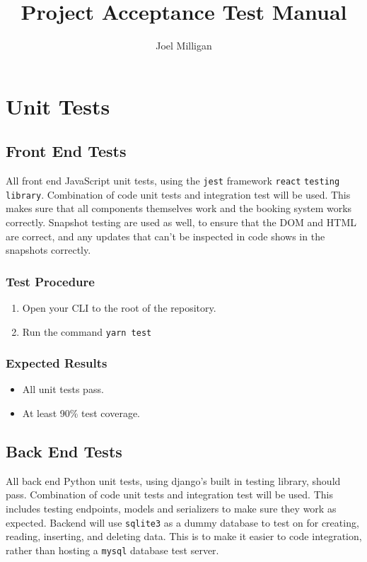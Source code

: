 \documentclass[a4paper, draft]{article}
\author{Joel Milligan}
\title{Project Acceptance Test Manual}
\begin{document}
\setcounter{tocdepth}{2}
\setcounter{secnumdepth}{2}

\maketitle
\tableofcontents

\newpage
\section{Unit Tests}
\subsection{Front End Tests}
All front end JavaScript unit tests, using the \texttt{jest} framework \texttt{react} \texttt{testing} \texttt{library}. Combination of code unit tests and integration test will be used. This makes sure that all components themselves work and the booking system works correctly. Snapshot testing are used as well, to ensure that the DOM and HTML are correct, and any updates that can't be inspected in code shows in the snapshots correctly.

\subsubsection{Test Procedure}
\begin{enumerate}
  \item Open your CLI to the root of the repository.
  \item Run the command \texttt{yarn test}
\end{enumerate}

\subsubsection{Expected Results}
\begin{itemize}
  \item All unit tests pass.
  \item At least 90\% test coverage.
\end{itemize}

\subsection{Back End Tests}
All back end Python unit tests, using django's built in testing library, should pass. Combination of code unit tests and integration test will be used. This includes testing endpoints, models and serializers to make sure they work as expected. Backend will use \texttt{sqlite3} as a dummy database to test on for creating, reading, inserting, and deleting data. This is to make it easier to code integration, rather than hosting a \texttt{mysql} database test server.
\end{document}
